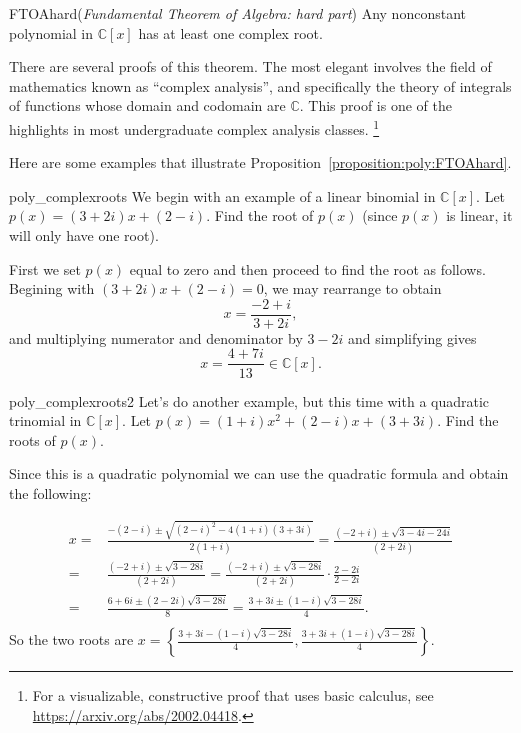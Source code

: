 \begin{prop}{FTOAhard}(\emph{Fundamental Theorem of Algebra: hard part})
Any nonconstant polynomial in $\mathbb{C}[x]$ has at least one complex root.
\end {prop}

There are several proofs of this theorem. The most elegant involves the field of mathematics known as ``complex analysis'', and specifically the theory of integrals of functions whose domain and codomain are $\mathbb{C}$.  This proof is one of the highlights in most undergraduate complex analysis classes. \footnote{For a visualizable, constructive proof that uses basic calculus, see \url{https://arxiv.org/abs/2002.04418}.}

Here are some examples that illustrate Proposition~\ref{proposition:poly:FTOAhard}. 

\begin{example}{poly_complexroots} 
We begin with an example of a linear binomial in $\mathbb{C}[x]$. 
Let $p(x)=(3+2i)x+(2-i)$. Find the root of $p(x)$ (since $p(x)$ is linear, it will only have one root).

First we set $p(x)$ equal to zero and then proceed to find the root as follows. Begining with
$(3+2i)x+(2-i)=0$, we may rearrange to obtain
$$x=\frac{-2+i}{3+2i},$$
and multiplying numerator and denominator by $3 - 2i$ and simplifying gives
$$x=\frac{4+7i}{13}\in \mathbb{C}[x].$$
\end{example}

\begin{example}{poly_complexroots2} 
Let's do another example, but this time with a quadratic trinomial in $\mathbb{C}[x]$. 
Let $p(x)=(1+i)x^2+(2-i)x+(3+3i)$. Find the roots of $p(x)$.

Since this is a quadratic polynomial we can use the quadratic formula and obtain the following:

\begin{align*}
x=&\frac {-(2-i) \pm \sqrt{(2-i)^2-4(1+i)(3+3i)}}{2(1+i)}=\frac {(-2+i) \pm \sqrt{3-4i-24i}}{(2+2i)}\\
=&\frac {(-2+i) \pm \sqrt{3-28i}}{(2+2i)}=\frac {(-2+i) \pm \sqrt{3-28i}}{(2+2i)}\cdot \frac {2-2i}{2-2i}\\
=&\frac{6+6i\pm (2-2i)\sqrt{3-28i}}{8}=\frac{3+3i\pm (1-i)\sqrt{3-28i}}{4}.\\
\end{align*}
So the two roots are $x=\left\{\frac{3+3i- (1-i)\sqrt{3-28i}}{4}, \frac{3+3i+ (1-i)\sqrt{3-28i}}{4}\right\}$.
\end{example}


